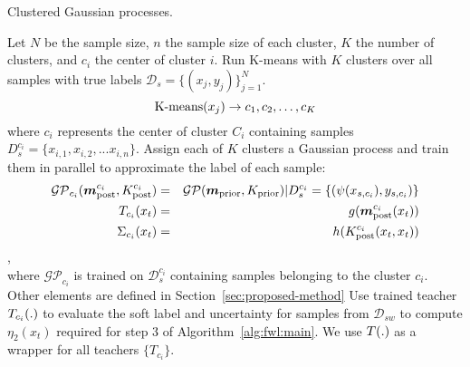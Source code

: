 \begin{algorithm}[t!]
\caption{Clustered Gaussian processes.}%
\begin{algorithmic}[1]
\State Let $N$ be the sample size, $n$ the sample size of each cluster, $K$ the number of clusters, and $c_i$ the center of cluster $i$.
\medskip
\State Run K-means with $K$ clusters over all samples with true labels $\mathcal{D}_s=\{(x_j,y_j)\}_{j=1}^N$.
\begin{equation*}
    {\rm K\mbox{-}means}({x_j}) \rightarrow {c_1, c_2, \ldots, c_K}
\end{equation*}
where $c_i$ represents the center of cluster $C_i$ containing samples $D_s^{c_i}=\{x_{i,1}, x_{i,2}, ... x_{i,n}\}$.
\medskip
\State Assign each of $K$ clusters a Gaussian process and train them in parallel to approximate the label of each sample:
\begin{eqnarray*}
\mathcal{GP}_{c_i}(\bm{m}_{\rm post}^{c_i}, K_{\rm post}^{c_i})&=&\mathcal{GP}(\bm{m}_{\rm prior}, K_{\rm prior}) | D_s^{c_i}=\{(\psi(x_{s,c_i}),y_{s,c_i})\}\\
T_{c_i}(x_t) &=& g(\bm{m}_{\rm post}^{c_i}(x_t))\\
\Sigma_{c_i}(x_t) &=& h(K_{\rm post}^{c_i}(x_t,x_t))
\end{eqnarray*}, \\
where $\mathcal{GP}_{c_i}$ is trained on $\mathcal{D}_s^{c_i}$ containing samples belonging to the cluster $c_i$. Other elements are defined in Section~\ref{sec:proposed-method}
\medskip
\State Use trained teacher $T_{c_i}(.)$ to evaluate the soft label and uncertainty for samples from $\mathcal{D}_{sw}$ to compute $\eta_2(x_t)$ required for step 3 of Algorithm~\ref{alg:fwl:main}. We use $T(.)$ as a wrapper for all teachers $\{T_{c_i}\}$.
\end{algorithmic}
\label{alg:CGP}
\end{algorithm}
\shrink

